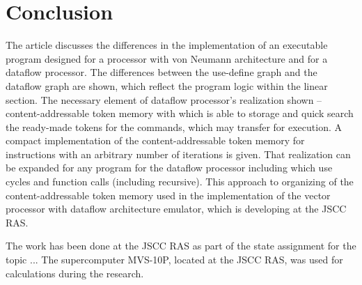 \documentclass[
11pt,%
tightenlines,%
twoside,%
onecolumn,%
nofloats,%
nobibnotes,%
nofootinbib,%
superscriptaddress,%
noshowpacs,%
centertags]%
{revtex4}
\begin{document}
\section{Conclusion}

The article discusses the differences in the implementation of an executable program designed for a processor with von Neumann architecture and for a dataflow processor. The differences between the use-define graph and the dataflow graph are shown, which reflect the program logic within the linear section. The necessary element of dataflow processor’s realization shown -- content-addressable token memory with which is able to storage and quick search the ready-made tokens for the commands, which may transfer for execution. A compact implementation of the content-addressable token memory for instructions with an arbitrary number of iterations is given. That realization can be expanded for any program for the dataflow processor including which use cycles and function calls (including recursive). This approach to organizing of the content-addressable token memory used in the implementation of the vector processor with dataflow architecture emulator, which is developing at the JSCC RAS.

\begin{acknowledgments}
The work has been done at the JSCC RAS as part of the state assignment for the topic ... The supercomputer MVS-10P, located at the JSCC RAS, was used for calculations during the research.
\end{acknowledgments}
\end{document}
